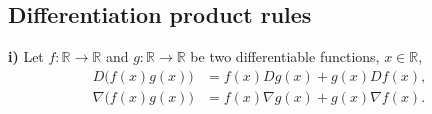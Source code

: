 \documentclass[12pt,thmsa]{article}
\begin{document}
\begin{itemize}
\end{itemize}


\subsection{Differentiation product rules}

\textbf{i)} Let \(f: \mathbb{R} \rightarrow \mathbb{R}\) and \(g: \mathbb{R} \rightarrow \mathbb{R}\) be two differentiable functions, \(x \in \mathbb{R}\),
\[ 
\begin{aligned}
	D \bigg (f(x) g(x) \bigg )
	& = f(x)  D g(x)
	+g(x)  D f(x),  \\
	\nabla \bigg (f(x) g(x) \bigg )
	& = f(x)  \nabla g(x)
	+g(x)  \nabla f(x). 
\end{aligned}
\]
\end{document}
